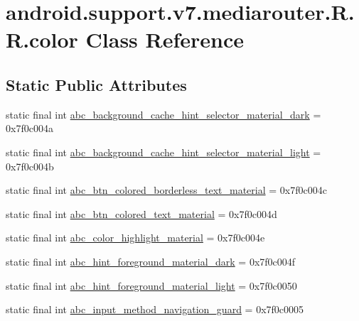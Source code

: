 \hypertarget{classandroid_1_1support_1_1v7_1_1mediarouter_1_1_r_1_1color}{
\section{android.support.v7.mediarouter.R.R.color Class Reference}
\label{classandroid_1_1support_1_1v7_1_1mediarouter_1_1_r_1_1color}
}
\subsection*{Static Public Attributes}
\begin{CompactItemize}
\item 
static final int \hyperlink{classandroid_1_1support_1_1v7_1_1mediarouter_1_1_r_1_1color_349a8505bd96c05b2759d2cdd5846b76}{abc\_\-background\_\-cache\_\-hint\_\-selector\_\-material\_\-dark} = 0x7f0c004a
\item 
static final int \hyperlink{classandroid_1_1support_1_1v7_1_1mediarouter_1_1_r_1_1color_24a9dcf131a74f10497edfb8bfdb56a0}{abc\_\-background\_\-cache\_\-hint\_\-selector\_\-material\_\-light} = 0x7f0c004b
\item 
static final int \hyperlink{classandroid_1_1support_1_1v7_1_1mediarouter_1_1_r_1_1color_a5db48663aeb98d7c115a46af6fcd365}{abc\_\-btn\_\-colored\_\-borderless\_\-text\_\-material} = 0x7f0c004c
\item 
static final int \hyperlink{classandroid_1_1support_1_1v7_1_1mediarouter_1_1_r_1_1color_e6cdc97dd7f7b9080f0210c454d58945}{abc\_\-btn\_\-colored\_\-text\_\-material} = 0x7f0c004d
\item 
static final int \hyperlink{classandroid_1_1support_1_1v7_1_1mediarouter_1_1_r_1_1color_2f55523181526c7e253b888a47522860}{abc\_\-color\_\-highlight\_\-material} = 0x7f0c004e
\item 
static final int \hyperlink{classandroid_1_1support_1_1v7_1_1mediarouter_1_1_r_1_1color_fdb1483f01ed6807232f72f51992aa44}{abc\_\-hint\_\-foreground\_\-material\_\-dark} = 0x7f0c004f
\item 
static final int \hyperlink{classandroid_1_1support_1_1v7_1_1mediarouter_1_1_r_1_1color_7290573251f97ca744953deb7ca900df}{abc\_\-hint\_\-foreground\_\-material\_\-light} = 0x7f0c0050
\item 
static final int \hyperlink{classandroid_1_1support_1_1v7_1_1mediarouter_1_1_r_1_1color_08d20227823b83dd2ca5078db6f7515a}{abc\_\-input\_\-method\_\-navigation\_\-guard} = 0x7f0c0005

\end{CompactItemize}

